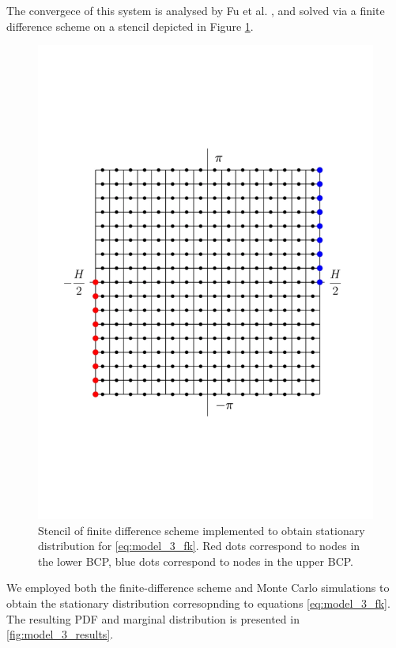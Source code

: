 The convergece of this system is analysed by Fu et al. \cite{fu2021fokker}, and solved 
via a finite difference scheme on a stencil depicted in Figure \ref{fig:model_3_stencil}.

\begin{figure}[htbp]
    \centering
    \includegraphics[scale=0.4]{graphics/model_3_stencil.pdf}
    \caption{Stencil of finite difference scheme implemented to obtain stationary distribution for \eqref{eq:model_3_fk}.
    Red dots correspond to nodes in the lower BCP, blue dots correspond to nodes in the upper BCP.}
    \label{fig:model_3_stencil}
\end{figure}


We employed both the finite-difference scheme and Monte Carlo simulations to obtain the stationary distribution 
corresopnding to equations \eqref{eq:model_3_fk}. The resulting PDF and marginal distribution is presented in 
\ref{fig:model_3_results}.

